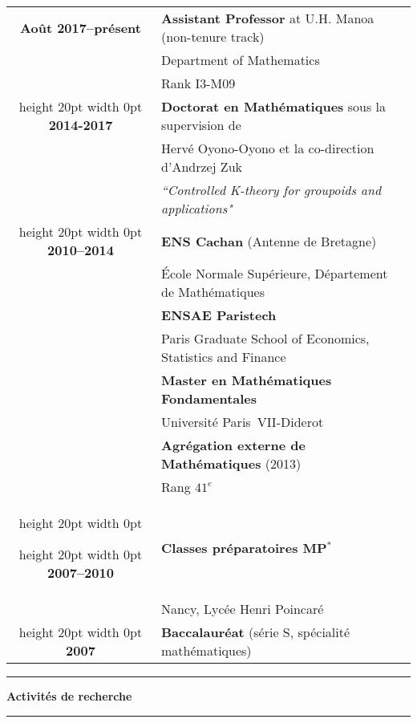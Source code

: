 \documentclass[a4paper,11pt]{article}
\newcommand\espace{\vrule height 20pt width 0pt}
\newcommand{\titre}[1]{%
	\begin{center}
	\bigskip
	\rule{\textwidth}{1pt}
	\par\vspace{0.1cm}
        \textbf{\large #1}
	\par\rule{\textwidth}{1pt}
	\end{center}
	\bigskip
	}
\begin{document}
\begin{tabular}{cp{}}

\textbf{Ao\^{u}t 2017--pr\'{e}sent} &  \textbf{Assistant Professor} at U.H. Manoa (non-tenure track)  \\
						& Department of Mathematics\\
						&  Rank I3-M09 \\
						\espace
\textbf{2014-2017} &  \textbf{Doctorat en Math\'ematiques} sous la supervision de \\
						& Hervé Oyono-Oyono et la co-direction d'Andrzej Zuk \\	
						& \textit{``Controlled K-theory for groupoids and applications"} \\
\espace
\textbf{2010--2014} &  \textbf{ENS Cachan} (Antenne de Bretagne) \\
				    & 	\'Ecole Normale Supérieure, D\'epartement de Math\'ematiques \\
                              & \textbf{ENSAE Paristech}\\
				&	Paris Graduate School of Economics, Statistics and Finance\\
                                   & \textbf{Master en Math\'ematiques Fondamentales}\\  & Universit\'e Paris~VII-Diderot \\
                                   & \textbf{Agrégation externe de Mathématiques} (2013) \\ 
							& Rang $41^e$ \\
\espace

\espace
\textbf{2007--2010} &\textbf{Classes préparatoires MP$^*$ } \\
					& Nancy, Lycée Henri Poincaré\\

\espace
\textbf{2007} & \textbf{Baccalauréat} (série S, sp\'ecialit\'e math\'ematiques) 
 \\

\end{tabular}

\newpage
\titre{Activit\'es de recherche}
\end{document}
